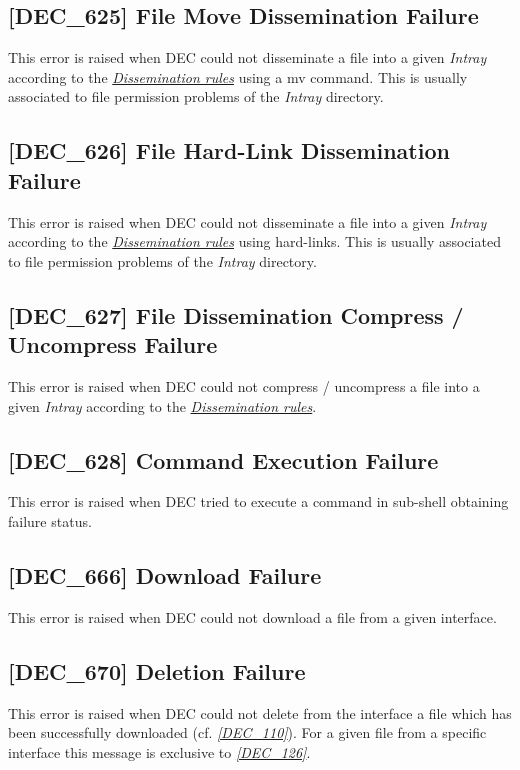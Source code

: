 \documentclass[dec_sum_main.tex]{subfiles}
\begin{document}
\subsection{[DEC\_625] File Move Dissemination Failure}
\label{DEC625}
This error is raised when DEC could not disseminate a file into a given \textit{Intray} according to the \hyperref[Dissemination rules]{\textit{Dissemination rules}} using a mv command. This is usually associated to file permission problems of the \textit{Intray} directory.

\subsection{[DEC\_626] File Hard-Link Dissemination Failure}
\label{DEC626}
This error is raised when DEC could not disseminate a file into a given \textit{Intray} according to the \hyperref[Dissemination rules]{\textit{Dissemination rules}} using hard-links. This is usually associated to file permission problems of the \textit{Intray} directory.

\subsection{[DEC\_627] File Dissemination Compress / Uncompress Failure}
\label{DEC627}
This error is raised when DEC could not compress / uncompress a file into a given \textit{Intray} according to the \hyperref[Dissemination rules]{\textit{Dissemination rules}}.

\subsection{[DEC\_628] Command Execution Failure}
\label{DEC628}
This error is raised when DEC tried to execute a command in sub-shell obtaining failure status.

\subsection{[DEC\_666] Download Failure}
\label{DEC666}
This error is raised when DEC could not download a file from a given interface.

\label{DEC670}
\subsection{[DEC\_670] Deletion Failure}
This error is raised when DEC could not delete from the interface a file which has been successfully downloaded (cf. \hyperref[DEC110]{\textit{[DEC\_110]}}).
For a given file from a specific interface this message is exclusive to \hyperref[DEC126]{\textit{[DEC\_126]}}.
\end{document}
